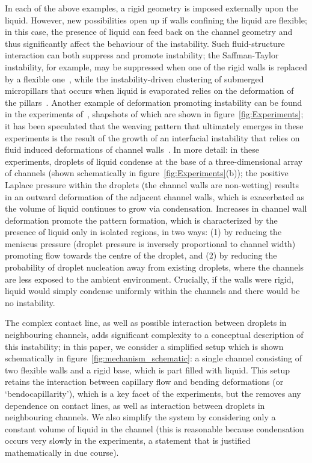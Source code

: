 \documentclass{jfm}
\begin{document}
 In each of the above examples, a rigid geometry is imposed externally upon the liquid. However, new possibilities open up if walls confining the liquid are flexible; in this case, the presence of liquid can feed back on the channel geometry and thus significantly affect the behaviour of the instability. Such fluid-structure interaction can both suppress and promote instability;  the Saffman-Taylor instability, for example, may be suppressed when one of the rigid walls is replaced by a flexible one~\citep{PihlerPuzovic2012PRL, PihlerPuzovic2013JFM}, while the instability-driven clustering of submerged micropillars that occurs when liquid is evaporated relies on the deformation of the pillars~\citep{DeVolder2013Angewandte}.  Another example of deformation promoting instability can be found in the experiments of~\citet{Seemann2011JPhysCondMat}, shapshots of which are shown in figure~\ref{fig:Experiments}; it has been speculated that the weaving pattern that ultimately emerges in these experiments is the result of the growth of an interfacial instability that relies on fluid induced deformations of channel walls~\citep{BradleyPhDthesis}. In more detail: in these experiments, droplets of liquid condense at the base of a three-dimensional array of channels (shown schematically in figure~\ref{fig:Experiments}(b)); the positive Laplace pressure within the droplets (the channel walls are non-wetting) results in an outward deformation of the adjacent channel walls, which is exacerbated as the volume of liquid continues to grow via condensation. Increases in channel wall deformation promote the pattern formation, which is characterized by the presence of liquid only in isolated regions, in two ways: (1) by reducing the meniscus pressure (droplet pressure is inversely proportional to channel width) promoting flow towards the centre of the droplet, and (2) by reducing the probability of droplet nucleation away from existing droplets, where the channels are less exposed to the ambient environment. Crucially, if the walls were rigid, liquid would simply condense uniformly within the channels and there would be no instability. 

The complex contact line, as well as possible interaction between droplets in neighbouring channels, adds significant complexity to a conceptual description of this instability; in this paper, we consider a simplified setup which is shown schematically in figure~\ref{fig:mechanism_schematic}: a single channel consisting of two flexible walls and a rigid base, which is part filled with liquid. This setup retains the interaction between capillary flow and bending deformations (or `bendocapillarity'), which is a key facet of the experiments, but the removes any dependence on contact lines, as well as interaction between droplets in neighbouring channels. We also simplify the system by considering only a constant volume of liquid in the channel (this is reasonable because condensation occurs very slowly in the experiments, a statement that is justified mathematically in due course).
\end{document}
